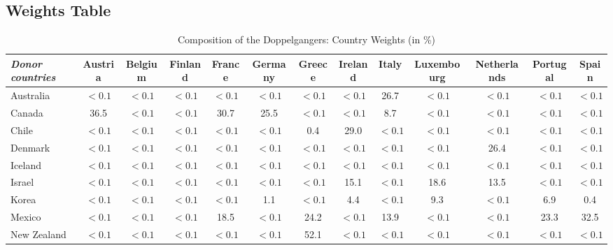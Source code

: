 \documentclass[12pt]{article}
\begin{document}
\begin{appendices}
\clearpage
\begin{landscape}
\subsection{Weights Table}
\begin{table}[htbp]
\scriptsize
\caption{\label{TA_weights} Composition of the Doppelgangers: Country Weights (in \%)}\centering\medskip
\begin{tabular}{lcccccccccccc} \toprule
\textit{Donor countries} & Austria  & Belgium  & Finland  & France  & Germany  & Greece  & Ireland  & Italy  & Luxembourg  & Netherlands  & Portugal  & Spain  \\  \midrule
Australia &       $<0.1$ &       $<0.1$ &       $<0.1$ &       $<0.1$ &       $<0.1$ &       $<0.1$ &       $<0.1$ &       26.7 &       $<0.1$ &       $<0.1$ &       $<0.1$ &       $<0.1$ \\  
Canada &       36.5 &       $<0.1$ &       $<0.1$ &       30.7 &       25.5 &       $<0.1$ &       $<0.1$ &       8.7 &       $<0.1$ &       $<0.1$ &       $<0.1$ &       $<0.1$ \\  
Chile &        $<0.1$ &       $<0.1$ &       $<0.1$ &       $<0.1$ &       $<0.1$ &       0.4 &      29.0 &       $<0.1$ &       $<0.1$ &      $<0.1$ &       $<0.1$ &       $<0.1$ \\  
Denmark &       $<0.1$ &       $<0.1$ &       $<0.1$ &       $<0.1$ &      $<0.1$ &       $<0.1$ &       $<0.1$ &       $<0.1$ &       $<0.1$ &       26.4 &       $<0.1$ &       $<0.1$ \\  
Iceland &       $<0.1$ &       $<0.1$ &       $<0.1$ &       $<0.1$ &       $<0.1$ &       $<0.1$ &       $<0.1$ &       $<0.1$ &       $<0.1$ &       $<0.1$ &       $<0.1$ &       $<0.1$ \\  
Israel &       $<0.1$ &       $<0.1$ &       $<0.1$ &       $<0.1$ &       $<0.1$ &       $<0.1$ &      15.1 &       $<0.1$ &       18.6 &       13.5 &      $<0.1$ &       $<0.1$ \\  
Korea &      $<0.1$ &       $<0.1$ &       $<0.1$ &       $<0.1$ &       1.1 &       $<0.1$ &       4.4 &       $<0.1$ &      9.3 &       $<0.1$ &      6.9&   0.4 \\  
Mexico &      $<0.1$ &      $<0.1$ &      $<0.1$ &     18.5 &       $<0.1$ &      24.2 &     $<0.1$ &     13.9 &       $<0.1$ &    $<0.1$ &      23.3 &      32.5 \\  
New Zealand &       $<0.1$ &       $<0.1$ &       $<0.1$ &       $<0.1$ &       $<0.1$ &      52.1 &       $<0.1$ &       $<0.1$ &       $<0.1$ &       $<0.1$ &       $<0.1$ &       $<0.1$ \\  

\end{tabular}
\end{table}
\end{landscape}
\end{appendices}
\end{document}
